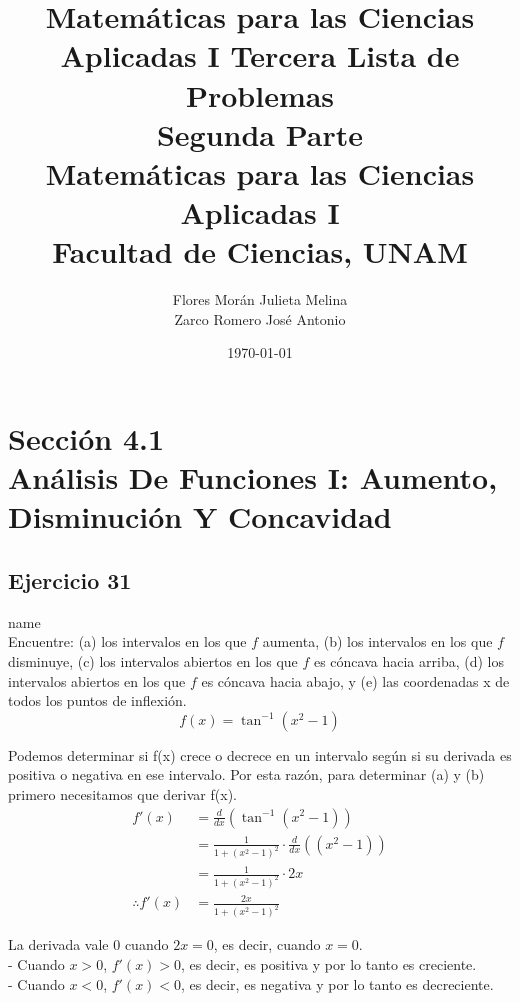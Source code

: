 \documentclass[12pt]{article}
\title{Matemáticas para las Ciencias Aplicadas I}
\title{
	Tercera Lista de Problemas \\
	\textbf{Segunda  Parte} \\
	\vspace{1ex}
	\large Matemáticas para las Ciencias Aplicadas I \\
	Facultad de Ciencias, UNAM}
\date{\today}
\author{Flores Morán Julieta Melina \\ Zarco Romero José Antonio}
\begin{document}
\maketitle


\section{Sección 4.1 \\ Análisis De Funciones I: Aumento, Disminución Y Concavidad}
\subsection{Ejercicio 31} name \\

Encuentre: (a) los intervalos en los que $f$ aumenta, (b) los intervalos en los que $f$ disminuye, (c) los intervalos abiertos en los que $f$ es cóncava hacia arriba, (d) los intervalos abiertos en los que $f$ es cóncava hacia abajo, y (e) las coordenadas x de todos los puntos de inflexión.
\[
f(x) = \tan^{-1}(x^2-1)
\]

 Podemos determinar si f(x) crece o decrece en un intervalo según si su derivada es positiva o negativa en ese intervalo. Por esta razón, para determinar (a) y (b) primero necesitamos que derivar f(x).
  \begin{equation*}
  \begin{split}
    f'(x)
    &= \frac{d}{dx}(\tan^{-1}(x^2-1)) \\
    &= \frac{1}{1+(x^{2}-1)^{2}} \cdot \frac{d}{dx}((x^{2}-1)) \\
    &= \frac{1}{1+(x^{2}-1)^{2}} \cdot 2x \\
    \therefore
    f'(x)
    &= \frac{2x}{1+(x^{2}-1)^{2}}
  \end{split}
  \end{equation*}

  La derivada vale $0$ cuando $2x = 0$, es decir, cuando $x=0$. \\
   - Cuando $x>0$, $f'(x)>0$, es decir, es positiva y por lo tanto es creciente. \\
  - Cuando $x<0$, $f'(x)<0$, es decir, es negativa y por lo tanto es decreciente.\\
\end{document}
